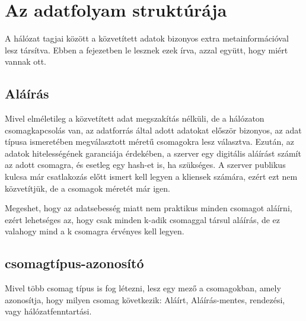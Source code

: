 \chapter{Az adatfolyam struktúrája}

A hálózat tagjai között a közvetített adatok bizonyos extra
metainformációval lesz társítva. Ebben a fejezetben le lesznek ezek írva,
azzal együtt, hogy miért vannak ott.

\section{Aláírás}

Mivel elméletileg a közvetített adat megszakítás nélküli, de a hálózaton
csomagkapcsolás van, az adatforrás által adott adatokat először bizonyos,
az adat típusa ismeretében megválasztott méretű csomagokra lesz választva.
Ezután, az adatok hitelességének garanciája érdekében, a szerver egy
digitális aláírást számít az adott csomagra, és esetleg egy hash-et is,
ha szükséges. A szerver publikus kulcsa már csatlakozás előtt ismert kell
legyen a kliensek számára, ezért ezt nem közvetítjük, de a csomagok
méretét már igen.

Megeshet, hogy az adatsebesség miatt nem praktikus minden csomagot
aláírni, ezért lehetséges az, hogy csak minden k-adik csomaggal társul
aláírás, de ez valahogy mind a k csomagra érvényes kell legyen.

\section{csomagtípus-azonosító}

Mivel több csomag típus is fog létezni, lesz egy mező a csomagokban,
amely azonosítja, hogy milyen csomag következik: Aláírt, Aláírás-mentes,
rendezési, vagy hálózatfenntartási.
